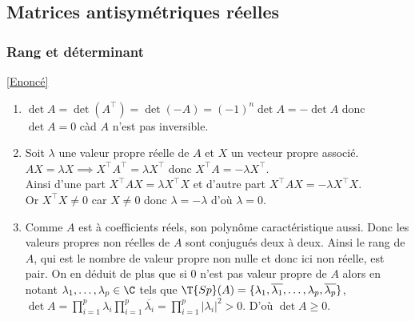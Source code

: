 \documentclass[8pt]{book}
\begin{document}
	\subsection{Matrices antisymétriques réelles}
	\subsubsection{Rang et déterminant}
	\label{Rang et déterminant corrigé}
	\textcolor{blue}{\hyperref[Rang et déterminant]{[Enoncé]}}\\
	\begin{enumerate}[leftmargin=*]
		\item $\det A=\det(A^\top)=\det(-A)=(-1)^n\det A=-\det A$ donc $\det A=0$ càd $A$ n'est pas inversible.
		\item Soit $\lambda$ une valeur propre réelle de $A$ et $X$ un vecteur propre associé.\\
		$AX=\lambda X\implies X^\top A^\top=\lambda X^\top$ donc $X^\top A=-\lambda X^\top$.\\
		Ainsi d'une part $X^\top AX=\lambda X^\top X$ et d'autre part $X^\top AX=-\lambda X^\top X$.\\
		Or $X^\top X\ne 0$ car $X\ne 0$ donc $\lambda=-\lambda$ d'où $\lambda=0$.
		\item Comme $A$ est à coefficients réels, son polynôme caractéristique aussi. Donc les valeurs propres non réelles de $A$ sont conjugués deux à deux. Ainsi le rang de $A$, qui est le nombre de valeur propre non nulle et donc ici non réelle, est pair. On en déduit de plus que si $0$ n'est pas valeur propre de $A$ alors en notant $\lambda_1,\dots,\lambda_p\in \C$ tels que $\T{Sp}(A)=\{\lambda_1,\overline{\lambda_1},\dots,\lambda_p,\overline{\lambda_p}\}$, $\det A=\displaystyle\prod_{i=1}^p\lambda_i\prod_{i=1}^p\overline{\lambda_i}=\prod_{i=1}^p|\lambda_i|^2>0$. D'où $\det A\geq 0$.
	\end{enumerate}
	
\end{document}
